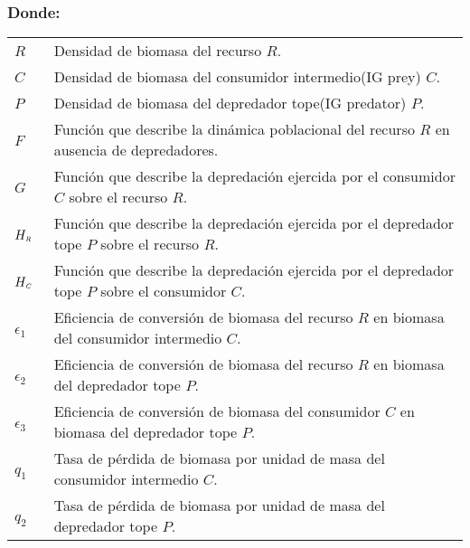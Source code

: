 \subsubsection*{Donde:}
\begin{tabular}{l@{:}p{5.8in}}
$R$\ &   Densidad de biomasa del recurso $R$.\\
$C$\ &  Densidad de biomasa del consumidor intermedio(IG prey) $C$.\\
$P$\ &  Densidad de biomasa del depredador tope(IG predator) $P$.\\
$F$\ &  Funci\'on que describe la din\'amica poblacional del recurso $R$ en ausencia de depredadores.\\
$G$\ &  Funci\'on que describe la depredaci\'on ejercida por el consumidor $C$ sobre el recurso $R$.\\
$H_{\textit{\tiny R}}$\ &  Funci\'on que describe la depredaci\'on ejercida por el depredador tope $P$ sobre el recurso $R$.\\
$H_{\textit{\tiny C}}$\ &  Funci\'on que describe la depredaci\'on ejercida por el depredador tope $P$ sobre el consumidor $C$.\\
$\epsilon_1$\ &  Eficiencia de conversi\'on de biomasa del recurso $R$ en biomasa del consumidor intermedio $C$.\\
$\epsilon_2$\ &  Eficiencia de conversi\'on de biomasa del recurso $R$ en biomasa del depredador tope $P$.\\
$\epsilon_3$\ &  Eficiencia de conversi\'on de biomasa del consumidor $C$ en biomasa del depredador tope $P$.\\
$q_1$\ &  Tasa de p\'erdida de biomasa por unidad de masa del consumidor intermedio $C$.\\
$q_2$\ &  Tasa de p\'erdida de biomasa por unidad de masa del depredador tope $P$.\\
\end{tabular}
